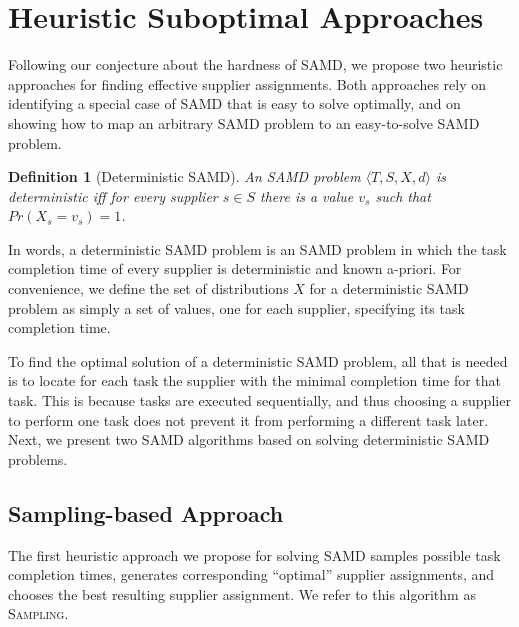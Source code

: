 \documentclass[letterpaper]{article}
\newtheorem{definition}{Definition}
\newcommand{\tuple}[1]{\langle#1\rangle}
\newcommand{\samd}{\ac{SAMD}\xspace}
\newcommand{\sampling}{\textsc{Sampling}\xspace}
\begin{document}
\section{Heuristic Suboptimal Approaches}

Following our conjecture about the hardness of \samd, we propose two heuristic approaches for finding effective supplier assignments. Both approaches rely on identifying a special case of \samd that is easy to solve optimally, and on showing how to map an arbitrary \samd problem to an easy-to-solve \samd problem.


\begin{definition}[Deterministic \samd]
An \samd problem $\tuple{T, S, X, d}$ is \emph{deterministic}
iff for every supplier $s\in S$ there is a value $v_s$ such that $Pr(X_s=v_s)=1$.
\label{def:deterministic}
\end{definition}
In words, a deterministic \samd problem is an \samd problem in which the task completion time of every supplier is deterministic and known a-priori. %
For convenience, we define the set of distributions $X$
for a deterministic \samd problem as simply a set of values, one for each supplier, specifying its task completion time. %

To find the optimal solution of a deterministic \samd problem, all that is needed is to locate for each task the supplier with the minimal completion time for that task. This is because tasks are executed sequentially, and thus choosing a supplier to perform one task does not prevent it from performing a different task later. Next, we present two \samd algorithms based on solving deterministic \samd problems.




\subsection{Sampling-based Approach}\label{sec:sampling}




The first heuristic approach we propose for solving \samd samples possible task completion times, generates corresponding ``optimal'' supplier assignments, and chooses the best resulting supplier assignment. We refer to this algorithm as \sampling.
\end{document}
